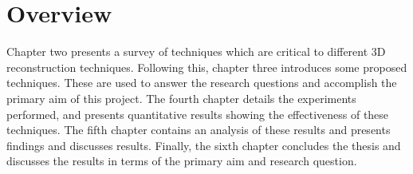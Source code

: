 \section{Overview}

Chapter two presents a survey of techniques which are critical to different 3D reconstruction techniques. Following this, chapter three introduces some proposed techniques. These are used to answer the research questions and accomplish the primary aim of this project. The fourth chapter details the experiments performed, and presents quantitative results showing the effectiveness of these techniques. The fifth chapter contains an analysis of these results and presents findings and discusses results. Finally, the sixth chapter concludes the thesis and discusses the results in terms of the primary aim and research question. 


